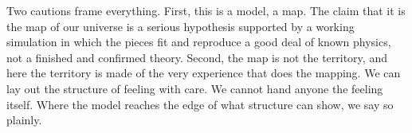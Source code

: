 Two cautions frame everything. First, this is a model, a map. The claim that it is the map of
our universe is a serious hypothesis supported by a working simulation in which the pieces fit
and reproduce a good deal of known physics, not a finished and confirmed theory. Second, the
map is not the territory, and here the territory is made of the very experience that does the
mapping. We can lay out the structure of feeling with care. We cannot hand anyone the feeling
itself. Where the model reaches the edge of what structure can show, we say so plainly.
